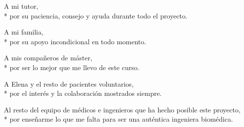 
A mi tutor, \\*
por su paciencia, consejo y ayuda durante todo el proyecto.

A mi familia, \\* 
por su apoyo incondicional en todo momento.

A mis compañeros de máster, \\*
por ser lo mejor que me llevo de este curso.

A Elena y el resto de pacientes voluntarios, \\*
por el interés y la colaboración mostrados siempre.

Al resto del equipo de médicos e ingenieros que ha hecho posible este proyecto, \\*
por enseñarme lo que me falta para ser una auténtica ingeniera biomédica.

